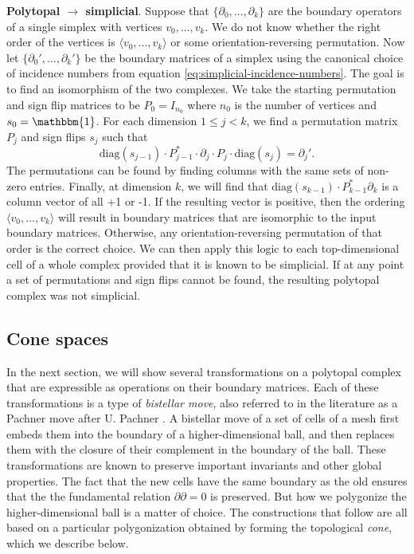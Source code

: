 \documentclass[twocolumn]{article}
\begin{document}
\textbf{Polytopal $\rightarrow$ simplicial}.
Suppose that $\{\partial_0, \ldots, \partial_k\}$ are the boundary operators of a single simplex with vertices $v_0, \ldots, v_k$.
We do not know whether the right order of the vertices is $\langle v_0,\ldots,v_k\rangle$ or some orientation-reversing permutation.
Now let $\{\partial_0',\ldots,\partial_k'\}$ be the boundary matrices of a simplex using the canonical choice of incidence numbers from equation \eqref{eq:simplicial-incidence-numbers}.
The goal is to find an isomorphism of the two complexes.
We take the starting permutation and sign flip matrices to be $P_0 = I_{n_0}$ where $n_0$ is the number of vertices and $s_0 = \mathbbm{1}$.
For each dimension $1 \le j < k$, we find a permutation matrix $P_j$ and sign flips $s_j$ such that
\begin{equation}
    \text{diag}(s_{j - 1})\cdot P_{j - 1}^*\cdot\partial_j \cdot P_j\cdot \text{diag}(s_j) = \partial_j'.
\end{equation}
The permutations can be found by finding columns with the same sets of non-zero entries.
Finally, at dimension $k$, we will find that $\text{diag}(s_{k - 1})\cdot P_{k - 1}^*\partial_k$ is a column vector of all +1 or -1.
If the resulting vector is positive, then the ordering $\langle v_0,\ldots,v_k\rangle$ will result in boundary matrices that are isomorphic to the input boundary matrices.
Otherwise, any orientation-reversing permutation of that order is the correct choice.
We can then apply this logic to each top-dimensional cell of a whole complex provided that it is known to be simplicial.
If at any point a set of permutations and sign flips cannot be found, the resulting polytopal complex was not simplicial.

\subsection{Cone spaces}

In the next section, we will show several transformations on a polytopal complex that are expressible as operations on their boundary matrices.
Each of these transformations is a type of \emph{bistellar move}, also referred to in the literature as a Pachner move after U. Pachner \cite{pachner1990shellings, pachner1991pl, casali1995note}.
A bistellar move of a set of cells of a mesh first embeds them into the boundary of a higher-dimensional ball, and then replaces them with the closure of their complement in the boundary of the ball.
These transformations are known to preserve important invariants and other global properties.
The fact that the new cells have the same boundary as the old ensures that the the fundamental relation $\partial\partial = 0$ is preserved.
But how we polygonize the higher-dimensional ball is a matter of choice.
The constructions that follow are all based on a particular polygonization obtained by forming the topological \emph{cone}, which we describe below.
\end{document}
